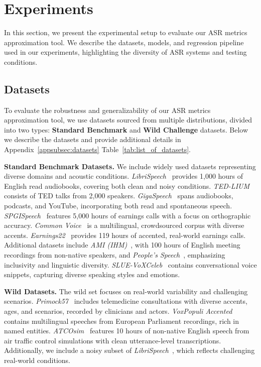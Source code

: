 \section{Experiments}\label{sec:experiments}
In this section, we present the experimental setup to evaluate our ASR metrics approximation tool. We describe the datasets, models, and regression pipeline used in our experiments, highlighting the diversity of ASR systems and testing conditions. 

\subsection{Datasets}\label{subsec:datasets}
To evaluate the robustness and generalizability of our ASR metrics approximation tool, we use datasets sourced from multiple distributions, divided into two types: \textbf{Standard Benchmark} and \textbf{Wild Challenge} datasets. Below we describe the datasets and provide additional details in Appendix~\ref{appsubsec:datasets} Table~\ref{tab:list_of_datasets}.


\noindent\textbf{Standard Benchmark Datasets.} We include widely used datasets representing diverse domains and acoustic conditions. \textit{LibriSpeech}~\cite{panayotov2015librispeech} provides 1,000 hours of English read audiobooks, covering both clean and noisy conditions. \textit{TED-LIUM}~\cite{rousseau2014tedlium} consists of TED talks from 2,000 speakers. \textit{GigaSpeech}~\cite{chen2021gigaspeech} spans audiobooks, podcasts, and YouTube, incorporating both read and spontaneous speech. \textit{SPGISpeech}~\cite{kensho2021spgispeech} features 5,000 hours of earnings calls with a focus on orthographic accuracy. \textit{Common Voice}~\cite{ardila2020common} is a multilingual, crowdsourced corpus with diverse accents. \textit{Earnings22}~\cite{rio2022earnings} provides 119 hours of accented, real-world earnings calls. Additional datasets include \textit{AMI (IHM)}~\cite{ami2005corpus}, with 100 hours of English meeting recordings from non-native speakers, and \textit{People's Speech}~\cite{galvez2021peoplesspeechlargescalediverse}, emphasizing inclusivity and linguistic diversity. \textit{SLUE-VoXCeleb}~\cite{shon2022slue} contains conversational voice snippets, capturing diverse speaking styles and emotions.

\noindent\textbf{Wild Datasets.} The wild set focuses on real-world variability and challenging scenarios. \textit{Primock57}~\cite{papadopoulos-korfiatis-etal-2022-primock57} includes telemedicine consultations with diverse accents, ages, and scenarios, recorded by clinicians and actors. \textit{VoxPopuli Accented}~\cite{wang-etal-2021-voxpopuli} contains multilingual speeches from European Parliament recordings, rich in named entities. \textit{ATCOsim}~\cite{jan_van_doorn_2023} features 10 hours of non-native English speech from air traffic control simulations with clean utterance-level transcriptions. Additionally, we include a noisy subset of \textit{LibriSpeech}~\cite{panayotov2015librispeech}, which reflects challenging real-world conditions.


